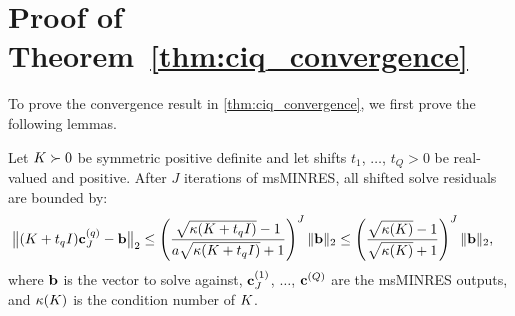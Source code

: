 \section{Proof of Theorem~\ref{thm:ciq_convergence}}
\label{app:ciq_proofs}

To prove the convergence result in \cref{thm:ciq_convergence}, we first prove the following lemmas.

\begin{lemma}
  Let $K \succ 0$ be symmetric positive definite and let shifts $t_1$, $\ldots$, $t_Q > 0$ be real-valued and positive.
  After $J$ iterations of msMINRES, all shifted solve residuals are bounded by:
  \begin{align*}
    \bigl\Vert (K + t_q I) \mathbf{c}_J^{(q)} - \mathbf{b} \bigr\Vert_2
    &\leq \left( \frac{
      \sqrt{\kappa(K + t_q I)} - 1
    }{a
      \sqrt{\kappa(K + t_q I)} + 1
    }\right)^J
    \Vert \mathbf{b} \Vert_2
    \leq \left( \frac{
      \sqrt{\kappa(K)} - 1
    }{
      \sqrt{\kappa(K)} + 1
    }\right)^J
    \Vert \mathbf{b} \Vert_2,
	\end{align*}
  where $\mathbf{b}$ is the vector to solve against, $\mathbf{c}^{(1)}_J$, $\ldots$, $\mathbf{c}^{(Q)}$ are the msMINRES outputs, and $\kappa(K)$ is the condition number of $K$.
  \label{lemma:minres}
\end{lemma}
%
